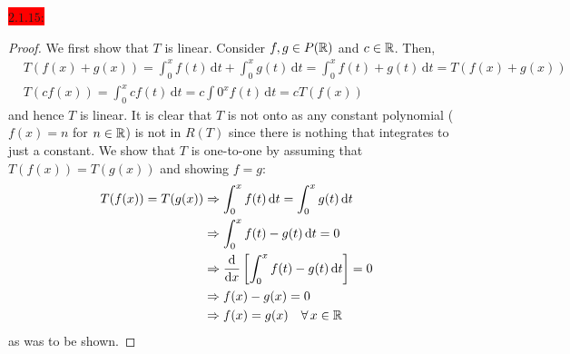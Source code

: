\documentclass{exam}
\begin{document}
  \colorbox{red}{\underline{$2.1.15$}:}
  \begin{solution}
    \begin{proof}
      We first show that $T$ is linear. Consider $f, g \in P(\mathbb R)$ and $c \in \mathbb R$. Then, 
      \begin{align*}
        &T(f(x) + g(x)) = \int_{0}^{x} f(t)\, \mathrm{d}t + \int_{0}^{x} g(t)\, \mathrm{d}t = \int_{0}^{x} f(t) + g(t)\, \mathrm{d}t = T(f(x) + g(x)) \\
        &T(cf(x)) = \int_{0}^{x} cf(t)\,\mathrm{d}t = c\int{0}^{x} f(t)\,\mathrm{d}t = cT(f(x))
      \end{align*}
      and hence $T$ is linear. It is clear that $T$ is not onto as any constant polynomial ($f(x) = n$ for $n \in \mathbb R$) is not in $R(T)$ since there is nothing that integrates to just a constant. We show that $T$ is one-to-one by assuming that $T(f(x)) = T(g(x))$ and showing $f = g$: 
      \begin{align*}
        T(f(x)) = T(g(x)) &\Rightarrow \int_{0}^{x} f(t)\, \mathrm{d}t = \int_{0}^{x} g(t)\,\mathrm{d}t \\
        &\Rightarrow \int_{0}^{x} f(t) - g(t)\,\mathrm{d}t = 0 \\
        &\Rightarrow \frac{\mathrm{d}}{\mathrm{d}x}\left[\int_{0}^{x}f(t) - g(t)\,\mathrm{d}t \right] = 0 \\
        &\Rightarrow f(x) - g(x) = 0 \\
        &\Rightarrow f(x) = g(x) \quad \forall\, x \in \mathbb R
      \end{align*}
      as was to be shown. 
    \end{proof}
  \end{solution}

  \newpage
\end{document}

